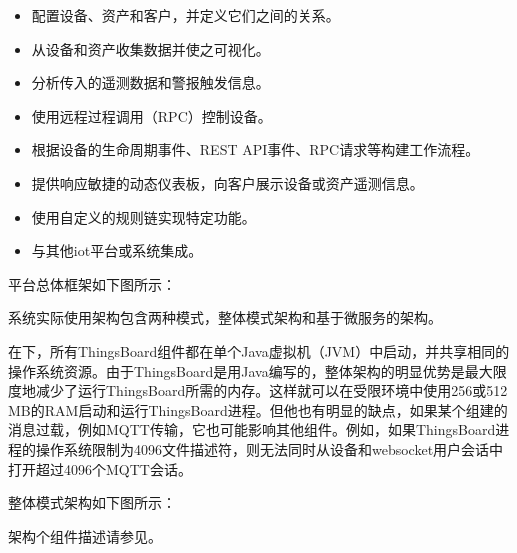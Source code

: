 \documentclass[a4paper,12pt,english]{sphinxmanual}
\begin{document}
\sphinxAtStartPar
{}
\begin{itemize}
\item {} 
\sphinxAtStartPar
配置设备、资产和客户，并定义它们之间的关系。

\item {} 
\sphinxAtStartPar
从设备和资产收集数据并使之可视化。

\item {} 
\sphinxAtStartPar
分析传入的遥测数据和警报触发信息。

\item {} 
\sphinxAtStartPar
使用远程过程调用（RPC）控制设备。

\item {} 
\sphinxAtStartPar
根据设备的生命周期事件、REST API事件、RPC请求等构建工作流程。

\item {} 
\sphinxAtStartPar
提供响应敏捷的动态仪表板，向客户展示设备或资产遥测信息。

\item {} 
\sphinxAtStartPar
使用自定义的规则链实现特定功能。

\item {} 
\sphinxAtStartPar
与其他iot平台或系统集成。

\end{itemize}

\sphinxAtStartPar
平台总体框架如下图所示：

\sphinxAtStartPar
{}

\sphinxAtStartPar
系统实际使用架构包含两种模式，整体模式架构和基于微服务的架构。

\sphinxAtStartPar
{}

\sphinxAtStartPar
在下，所有ThingsBoard组件都在单个Java虚拟机（JVM）中启动，并共享相同的操作系统资源。由于ThingsBoard是用Java编写的，整体架构的明显优势是最大限度地减少了运行ThingsBoard所需的内存。这样就可以在受限环境中使用256或512 MB的RAM启动和运行ThingsBoard进程。但他也有明显的缺点，如果某个组建的消息过载，例如MQTT传输，它也可能影响其他组件。例如，如果ThingsBoard进程的操作系统限制为4096文件描述符，则无法同时从设备和websocket用户会话中打开超过4096个MQTT会话。

\sphinxAtStartPar
整体模式架构如下图所示：

\sphinxAtStartPar
{}

\sphinxAtStartPar
架构个组件描述请参见。
\end{document}
